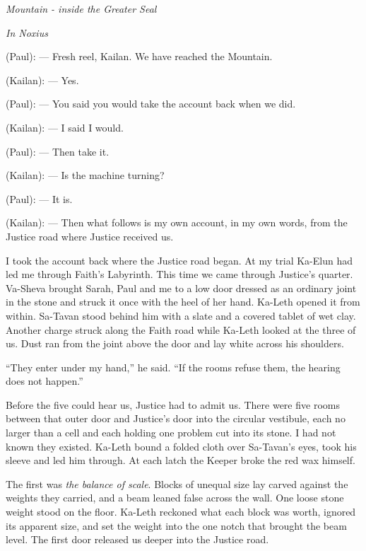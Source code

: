 
\begin{center}\small\itshape Mountain - inside the Greater Seal\end{center}

\begin{room}

\textit{In Noxius}

(Paul): --- Fresh reel, Kailan. We have reached the Mountain.

(Kailan): --- Yes.

(Paul): --- You said you would take the account back when we did.

(Kailan): --- I said I would.

(Paul): --- Then take it.

(Kailan): --- Is the machine turning?

(Paul): --- It is.

(Kailan): --- Then what follows is my own account, in my own words, from the Justice road where Justice received us.

\end{room}

I took the account back where the Justice road began. At my trial Ka-Elun had led me through Faith's Labyrinth. This time we came through Justice's quarter. Va-Sheva brought Sarah, Paul and me to a low door dressed as an ordinary joint in the stone and struck it once with the heel of her hand. Ka-Leth opened it from within. Sa-Tavan stood behind him with a slate and a covered tablet of wet clay. Another charge struck along the Faith road while Ka-Leth looked at the three of us. Dust ran from the joint above the door and lay white across his shoulders.

``They enter under my hand,'' he said. ``If the rooms refuse them, the hearing does not happen.''

Before the five could hear us, Justice had to admit us. There were five rooms between that outer door and Justice's door into the circular vestibule, each no larger than a cell and each holding one problem cut into its stone. I had not known they existed. Ka-Leth bound a folded cloth over Sa-Tavan's eyes, took his sleeve and led him through. At each latch the Keeper broke the red wax himself.

The first was \emph{the balance of scale}. Blocks of unequal size lay carved against the weights they carried, and a beam leaned false across the wall. One loose stone weight stood on the floor. Ka-Leth reckoned what each block was worth, ignored its apparent size, and set the weight into the one notch that brought the beam level. The first door released us deeper into the Justice road.

